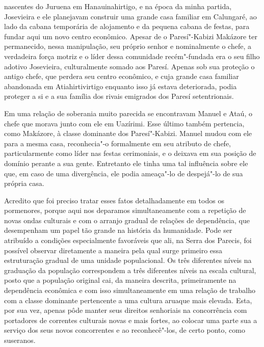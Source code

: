 nascentes do Juruena em Hanauinahirtigo, e na época da minha partida,
Josevieira e ele planejavam construir uma grande casa familiar em
Calungaré, ao lado da cabana temporária de alojamento e da pequena
cabana de festas, para fundar aqui um novo centro econômico. Apesar de o
Paresí"-Kabizi Makázore ter permanecido, nessa manipulação, seu próprio
senhor e nominalmente o chefe, a verdadeira força motriz e o líder dessa
comunidade recém"-fundada era o seu filho adotivo Josevieira,
culturalmente somado aos Paresí. Apenas sob sua proteção o antigo chefe,
que perdera seu centro econômico, e cuja grande casa familiar abandonada
em Atiahirtivirtigo enquanto isso já estava deteriorada, podia proteger
a si e a sua família dos rivais emigrados dos Paresí setentrionais.

Em uma relação de soberania muito parecida se encontravam Manuel e
Ataú, o chefe que morava junto com ele em Uazírimi. Esse último também
pertencia, como Makázore, à classe dominante dos Paresí"-Kabizi. Manuel
mudou com ele para a mesma casa, reconhecia"-o formalmente em seu
atributo de chefe, particularmente como líder nas festas cerimoniais, e
o deixava em sua posição de domínio perante a sua gente. Entretanto ele
tinha uma tal influência sobre ele que, em caso de uma divergência, ele
podia ameaça"-lo de despejá"-lo de sua própria casa.

Acredito que foi preciso tratar esses fatos detalhadamente em todos os
pormenores, porque aqui nos deparamos simultaneamente com a repetição
de novas ondas culturais e com o arranjo gradual de relações de
dependência, que desempenham um papel tão grande na história da
humanidade. Pode ser atribuído a condições especialmente favoráveis que
ali, na Serra dos Parecis, foi possível observar diretamente a maneira
pela qual surge primeiro essa estruturação gradual de uma unidade
populacional. Os três diferentes níveis na graduação da população
correspondem a três diferentes níveis na escala cultural, posto que a
população original cai, da maneira descrita, primeiramente na
dependência econômica e com isso simultaneamente em uma relação de
trabalho com a classe dominante pertencente a uma cultura aruaque mais
elevada. Esta, por sua vez, apenas pôde manter seus direitos senhoriais
na concorrência com portadores de correntes culturais novas e mais
fortes, ao colocar uma parte sua a serviço dos seus novos concorrentes e
ao reconhecê"-los, de certo ponto, como suseranos.

